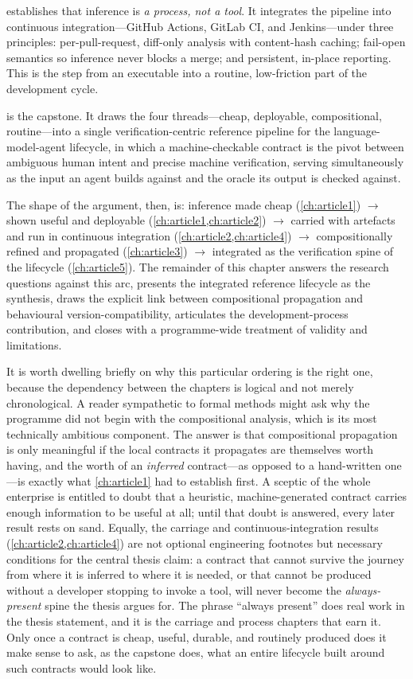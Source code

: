  establishes that inference is \emph{a process, not a tool}. It
integrates the pipeline into continuous integration---GitHub Actions, GitLab CI,
and Jenkins---under three principles: per-pull-request, diff-only analysis with
content-hash caching; fail-open semantics so inference never blocks a merge; and
persistent, in-place reporting. This is the step from an executable into a
routine, low-friction part of the development cycle.

 is the capstone. It draws the four threads---cheap, deployable,
compositional, routine---into a single verification-cen\-tric reference pipeline
for the lan\-guage-model-agent lifecycle, in which a machine-check\-able contract
is the pivot between ambiguous human intent and precise machine verification,
serving simultaneously as the input an agent builds against and the oracle its
output is checked against.

The shape of the argument, then, is: inference made cheap (\cref{ch:article1})
$\rightarrow$ shown useful and deployable (\cref{ch:article1,ch:article2})
$\rightarrow$ carried with artefacts and run in continuous integration
(\cref{ch:article2,ch:article4}) $\rightarrow$ compositionally refined and
propagated (\cref{ch:article3}) $\rightarrow$ integrated as the verification spine
of the lifecycle (\cref{ch:article5}). The remainder of this chapter answers the
research questions against this arc, presents the integrated reference lifecycle
as the synthesis, draws the explicit link between compositional propagation and
behavioural version-compatibility, articulates the development-process
contribution, and closes with a programme-wide treatment of validity and
limitations.

It is worth dwelling briefly on why this particular ordering is the right one,
because the dependency between the chapters is logical and not merely
chronological. A reader sympathetic to formal methods might ask why the programme
did not begin with the compositional analysis, which is its most technically
ambitious component. The answer is that compositional propagation is only
meaningful if the local contracts it propagates are themselves worth having, and
the worth of an \emph{inferred} contract---as opposed to a hand-written one---is
exactly what \cref{ch:article1} had to establish first. A sceptic of the whole
enterprise is entitled to doubt that a heuristic, machine-generated contract
carries enough information to be useful at all; until that doubt is answered,
every later result rests on sand. Equally, the carriage and continuous-integration
results (\cref{ch:article2,ch:article4}) are not optional engineering footnotes but
necessary conditions for the central thesis claim: a contract that cannot survive
the journey from where it is inferred to where it is needed, or that cannot be
produced without a developer stopping to invoke a tool, will never become the
\emph{always-present} spine the thesis argues for. The phrase ``always present''
does real work in the thesis statement, and it is the carriage and process chapters
that earn it. Only once a contract is cheap, useful, durable, and routinely
produced does it make sense to ask, as the capstone does, what an entire lifecycle
built around such contracts would look like.

